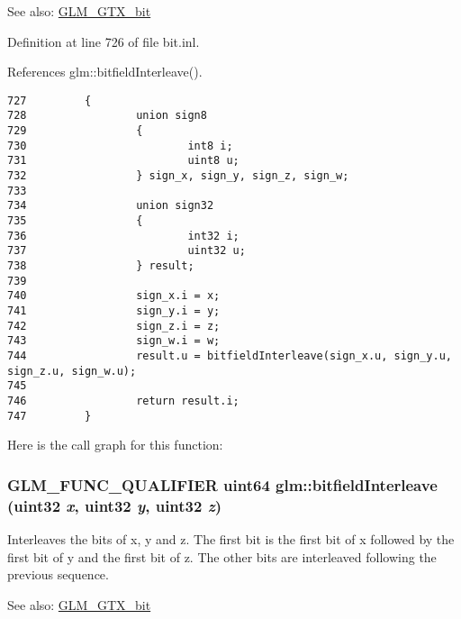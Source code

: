 \begin{Desc}
\item[See also:]\hyperlink{group__gtx__bit}{GLM\_\-GTX\_\-bit} \end{Desc}


Definition at line 726 of file bit.inl.

References glm::bitfieldInterleave().

\begin{Code}\begin{verbatim}727         {
728                 union sign8
729                 {
730                         int8 i;
731                         uint8 u;
732                 } sign_x, sign_y, sign_z, sign_w;
733 
734                 union sign32
735                 {
736                         int32 i;
737                         uint32 u;
738                 } result;
739 
740                 sign_x.i = x;
741                 sign_y.i = y;
742                 sign_z.i = z;
743                 sign_w.i = w;
744                 result.u = bitfieldInterleave(sign_x.u, sign_y.u, sign_z.u, sign_w.u);
745 
746                 return result.i;
747         }
\end{verbatim}
\end{Code}




Here is the call graph for this function:\hypertarget{group__gtx__bit_g7c10eb37f608365cfaef5ca2c476e1ce}{
\subsubsection[bitfieldInterleave]{\setlength{\rightskip}{0pt plus 5cm}GLM\_\-FUNC\_\-QUALIFIER uint64 glm::bitfieldInterleave (uint32 {\em x}, \/  uint32 {\em y}, \/  uint32 {\em z})}}
\label{group__gtx__bit_g7c10eb37f608365cfaef5ca2c476e1ce}


Interleaves the bits of x, y and z. The first bit is the first bit of x followed by the first bit of y and the first bit of z. The other bits are interleaved following the previous sequence.

\begin{Desc}
\item[See also:]\hyperlink{group__gtx__bit}{GLM\_\-GTX\_\-bit} \end{Desc}


